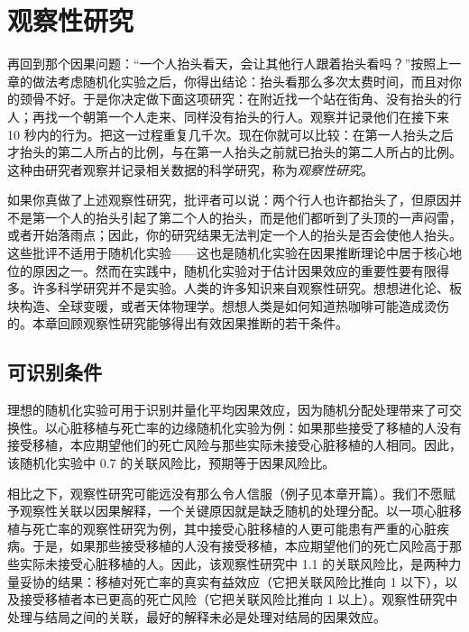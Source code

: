 \chapter{观察性研究}

再回到那个因果问题：“一个人抬头看天，会让其他行人跟着抬头看吗？”按照上一章的做法考虑随机化实验之后，你得出结论：抬头看那么多次太费时间，而且对你的颈骨不好。于是你决定做下面这项研究：在附近找一个站在街角、没有抬头的行人；再找一个朝第一个人走来、同样没有抬头的行人。观察并记录他们在接下来 10 秒内的行为。把这一过程重复几千次。现在你就可以比较：在第一人抬头之后才抬头的第二人所占的比例，与在第一人抬头之前就已抬头的第二人所占的比例。这种由研究者观察并记录相关数据的科学研究，称为\emph{观察性研究}。

如果你真做了上述观察性研究，批评者可以说：两个行人也许都抬头了，但原因并不是第一个人的抬头引起了第二个人的抬头，而是他们都听到了头顶的一声闷雷，或者开始落雨点；因此，你的研究结果无法判定一个人的抬头是否会使他人抬头。这些批评不适用于随机化实验——这也是随机化实验在因果推断理论中居于核心地位的原因之一。然而在实践中，随机化实验对于估计因果效应的重要性要有限得多。许多科学研究并不是实验。人类的许多知识来自观察性研究。想想进化论、板块构造、全球变暖，或者天体物理学。想想人类是如何知道热咖啡可能造成烫伤的。本章回顾观察性研究能够得出有效因果推断的若干条件。

\section{可识别条件}

理想的随机化实验可用于识别并量化平均因果效应，因为随机分配处理带来了可交换性。以心脏移植与死亡率的边缘随机化实验为例：如果那些接受了移植的人没有接受移植，本应期望他们的死亡风险与那些实际未接受心脏移植的人相同。因此，该随机化实验中 0.7 的关联风险比，预期等于因果风险比。


相比之下，观察性研究可能远没有那么令人信服（例子见本章开篇）。我们不愿赋予观察性关联以因果解释，一个关键原因就是缺乏随机的处理分配。以一项心脏移植与死亡率的观察性研究为例，其中接受心脏移植的人更可能患有严重的心脏疾病。于是，如果那些接受移植的人没有接受移植，本应期望他们的死亡风险高于那些实际未接受心脏移植的人。因此，该观察性研究中 1.1 的关联风险比，是两种力量妥协的结果：移植对死亡率的真实有益效应（它把关联风险比推向 1 以下），以及接受移植者本已更高的死亡风险（它把关联风险比推向 1 以上）。观察性研究中处理与结局之间的关联，最好的解释未必是处理对结局的因果效应。

